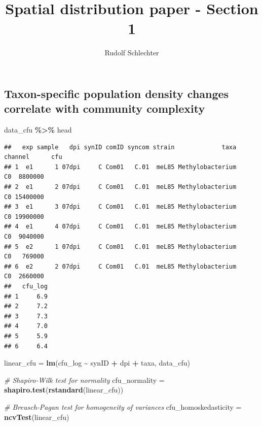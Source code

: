 \documentclass[
]{article}
\title{Spatial distribution paper - Section 1}
\author{Rudolf Schlechter}
\date{}
\newenvironment{Shaded}{\begin{snugshade}}{\end{snugshade}}
\newcommand{\CommentTok}[1]{\textcolor[rgb]{0.56,0.35,0.01}{\textit{#1}}}
\newcommand{\FunctionTok}[1]{\textcolor[rgb]{0.13,0.29,0.53}{\textbf{#1}}}
\newcommand{\NormalTok}[1]{#1}
\newcommand{\OtherTok}[1]{\textcolor[rgb]{0.56,0.35,0.01}{#1}}
\newcommand{\SpecialCharTok}[1]{\textcolor[rgb]{0.81,0.36,0.00}{\textbf{#1}}}
\begin{document}
\maketitle

\hypertarget{taxon-specific-population-density-changes-correlate-with-community-complexity}{%
\subsection{Taxon-specific population density changes correlate with
community
complexity}\label{taxon-specific-population-density-changes-correlate-with-community-complexity}}

\begin{Shaded}
\begin{Highlighting}[]
\NormalTok{data\_cfu }\SpecialCharTok{\%\textgreater{}\%}\NormalTok{ head}
\end{Highlighting}
\end{Shaded}

\begin{verbatim}
##   exp sample   dpi synID comID syncom strain             taxa channel      cfu
## 1  e1      1 07dpi     C Com01   C.01  meL85 Methylobacterium      C0  8800000
## 2  e1      2 07dpi     C Com01   C.01  meL85 Methylobacterium      C0 15400000
## 3  e1      3 07dpi     C Com01   C.01  meL85 Methylobacterium      C0 19900000
## 4  e1      4 07dpi     C Com01   C.01  meL85 Methylobacterium      C0  9040000
## 5  e2      1 07dpi     C Com01   C.01  meL85 Methylobacterium      C0   769000
## 6  e2      2 07dpi     C Com01   C.01  meL85 Methylobacterium      C0  2660000
##   cfu_log
## 1     6.9
## 2     7.2
## 3     7.3
## 4     7.0
## 5     5.9
## 6     6.4
\end{verbatim}

\begin{Shaded}
\begin{Highlighting}[]
\NormalTok{linear\_cfu }\OtherTok{=} \FunctionTok{lm}\NormalTok{(cfu\_log }\SpecialCharTok{\textasciitilde{}}\NormalTok{ synID }\SpecialCharTok{+}\NormalTok{ dpi }\SpecialCharTok{+}\NormalTok{ taxa, data\_cfu)}

\CommentTok{\# Shapiro{-}Wilk test for normality}
\NormalTok{cfu\_normality }\OtherTok{=} \FunctionTok{shapiro.test}\NormalTok{(}\FunctionTok{rstandard}\NormalTok{(linear\_cfu))}

\CommentTok{\# Breusch{-}Pagan test for homogeneity of variances}
\NormalTok{cfu\_homoskedasticity }\OtherTok{=} \FunctionTok{ncvTest}\NormalTok{(linear\_cfu)}
\end{Highlighting}
\end{Shaded}
\end{document}
